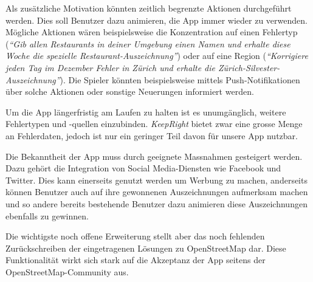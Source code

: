Als zusätzliche Motivation könnten zeitlich begrenzte Aktionen durchgeführt werden.
Dies soll Benutzer dazu animieren, die App immer wieder zu verwenden. 
Mögliche Aktionen wären beispielsweise die Konzentration auf einen Fehlertyp (\emph{"`Gib allen Restaurants in deiner Umgebung einen Namen und erhalte diese Woche die spezielle Restaurant-Auszeichnung"'}) oder auf eine Region (\emph{"`Korrigiere jeden Tag im Dezember Fehler in Zürich und erhalte die Zürich-Silvester-Auszeichnung"'}).
Die Spieler könnten beispielsweise mittels Push-Notifikationen über solche Aktionen oder sonstige Neuerungen informiert werden.

Um die App längerfristig am Laufen zu halten ist es unumgänglich, weitere Fehlertypen und -quellen einzubinden. 
\emph{KeepRight} bietet zwar eine grosse Menge an Fehlerdaten, jedoch ist nur ein geringer Teil davon für unsere App nutzbar.

Die Bekanntheit der App muss durch geeignete Massnahmen gesteigert werden. Dazu gehört die Integration von Social Media-Diensten wie Facebook und Twitter.
Dies kann einerseits genutzt werden um Werbung zu machen, anderseits können Benutzer auch auf ihre gewonnenen Auszeichnungen aufmerksam machen und so andere bereits bestehende Benutzer dazu animieren diese Auszeichnungen ebenfalls zu gewinnen.

Die wichtigste noch offene Erweiterung stellt aber das noch fehlenden Zurückschreiben der eingetragenen Lösungen zu \gls{OpenStreetMap} dar.
Diese Funktionalität wirkt sich stark auf die Akzeptanz der App seitens der \gls{OpenStreetMap}-Community aus.